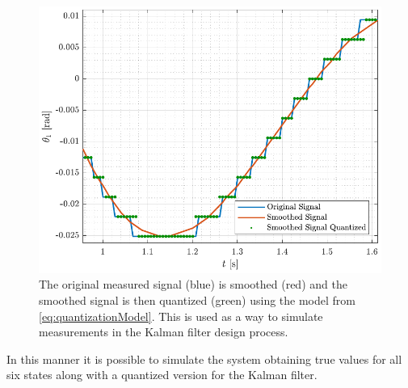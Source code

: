 %
\begin{figure}[H]
  \includegraphics[width=.7\textwidth]{figures/quantizationProblemModel}
  \caption{The original measured signal (blue) is smoothed (red) and the smoothed signal is then quantized (green) using the model from \autoref{eq:quantizationModel}. This is used as a way to simulate measurements in the Kalman filter design process.}
  \label{fig:quantizationProblemModel}
\end{figure}
%
In this manner it is possible to simulate the system obtaining true values for all six states along with a quantized version for the Kalman filter.


